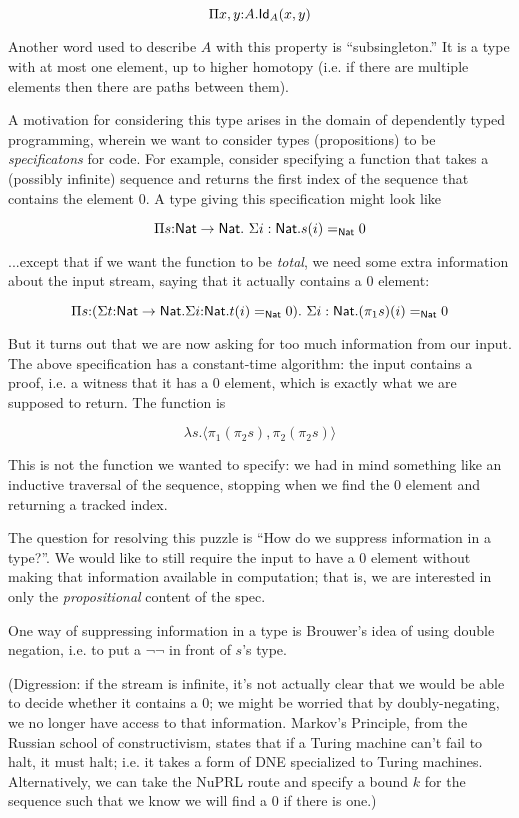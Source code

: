 \documentclass[11pt]{article}
\begin{document}
\[
\Pi{x,y}{:}A.\mathsf{Id}_{A}(x,y)
\]

Another word used to describe $A$ with this property is ``subsingleton.''
It is a type with at most one element, up to higher homotopy (i.e. if there
are multiple elements then there are paths between them).

A motivation for considering this type arises in the domain of dependently
typed programming, wherein we want to consider types (propositions) to be
{\em specificatons} for code. For example, consider specifying a function
that takes a (possibly infinite) sequence and returns the first index of
the sequence that contains the element $0$. A type giving this
specification might look like

\[
\Pi{s{:}\Nat\to\Nat}.\ \Sigma{i:\Nat}.s(i)=_{\Nat} 0
\]

...except that if we want the function to be {\em total}, we need some
extra information about the input stream, saying that it actually contains
a $0$ element:


\[
\Pi{s{:}(\Sigma{t{:}\Nat\to\Nat}.\Sigma{i{:}\Nat}.t(i) =_{\Nat}0}).\ 
  \Sigma{i:\Nat}.(\pi_1 s)(i)=_{\Nat} 0
\]

But it turns out that we are now asking for too much information from our
input. The above specification has a constant-time algorithm: the input
contains a proof, i.e. a witness that it has a 0 element, which is exactly
what we are supposed to return. The function is

\[
\lambda{s}.\langle \pi_1 (\pi_2 s), \pi_2 (\pi_2 s) \rangle
\]

This is not the function we wanted to specify: we had in mind something
like an inductive traversal of the sequence, stopping when we find the 0
element and returning a tracked index.

The question for resolving this puzzle is ``How do we suppress information
in a type?''. We would like to still require the input to have a 0 element
without making that information available in computation; that is, we are
interested in only the {\em propositional} content of the spec.

One way of suppressing information in a type is Brouwer's idea of using
double negation, i.e. to put a $\lnot\lnot$ in front of $s$'s type. 

(Digression: if the stream is infinite, it's not actually clear that we
would be able to decide whether it contains a 0; we might be worried that
by doubly-negating, we no longer have access to that information.
Markov's Principle, from the Russian school of constructivism, states that
if a Turing machine can't fail to halt, it must halt; i.e. it takes a form
of DNE specialized to Turing machines. Alternatively, we can take the NuPRL
route and specify a bound $k$ for the sequence such that we know we will
find a $0$ if there is one.)
\end{document}
